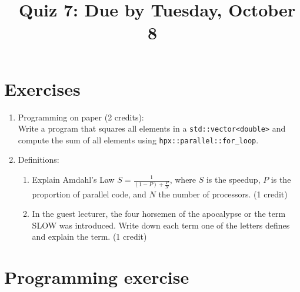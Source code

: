 \documentclass[11pt]{article}
\begin{document}
\title{\coursename~Quiz 7: Due by Tuesday, October 8}
\date{}
\maketitle

\medskip


\section*{Exercises}

\begin{enumerate}
\item Programming on paper (2 credits): \\
Write a program that squares all elements in a \lstinline|std::vector<double>| and compute the sum of all elements using \lstinline|hpx::parallel::for_loop|. 


\item Definitions: \\
\begin{enumerate}
\item Explain Amdahl's Law $S=\frac{1}{(1-P)+\frac{P}{N}}$, where $S$ is the speedup, $P$ is the proportion of parallel code, and $N$ the number of processors. (1 credit)
\item In the guest lecturer, the four horsemen of the apocalypse or the term SLOW was introduced. Write down each term one of the letters defines and explain the term. (1 credit)
\end{enumerate}



\end{enumerate}

\section*{Programming exercise}
\end{document}
